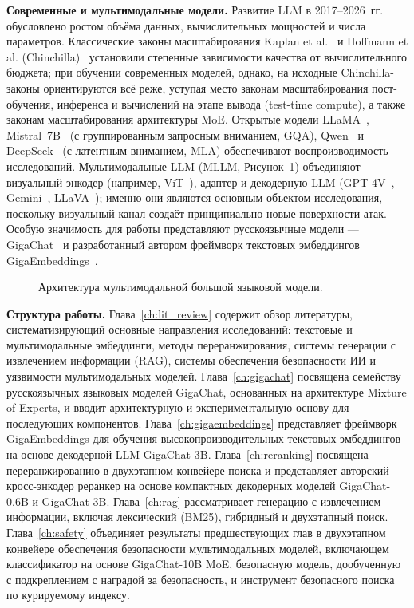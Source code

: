\textbf{Современные и мультимодальные модели.} Развитие LLM в 2017--2026~гг. обусловлено ростом объёма данных, вычислительных мощностей и числа параметров. Классические законы масштабирования Kaplan et al.~\cite{kaplan2020scaling} и Hoffmann et al. (Chinchilla)~\cite{hoffmann2022chinchilla} установили степенные зависимости качества от вычислительного бюджета; при обучении современных моделей, однако, на исходные Chinchilla-законы ориентируются всё реже, уступая место законам масштабирования пост-обучения, инференса и вычислений на этапе вывода (test-time compute), а также законам масштабирования архитектуры MoE. Открытые модели LLaMA~\cite{touvron2023llama,touvron2023llama2,grattafiori2024llama3}, Mistral~7B~\cite{jiang2023mistral} (с группированным запросным вниманием, GQA), Qwen~\cite{bai2023qwen} и DeepSeek~\cite{deepseek2024v2} (с латентным вниманием, MLA) обеспечивают воспроизводимость исследований. Мультимодальные LLM (MLLM, Рисунок~\ref{fig:multimodal_llm}) объединяют визуальный энкодер (например, ViT~\cite{dosovitskiy2020vit}), адаптер и декодерную LLM (GPT-4V~\cite{achiam2023gpt4}, Gemini~\cite{team2023gemini}, LLaVA~\cite{liu2024llava}); именно они являются основным объектом исследования, поскольку визуальный канал создаёт принципиально новые поверхности атак. Особую значимость для работы представляют русскоязычные модели --- GigaChat~\cite{2506.09440} и разработанный автором фреймворк текстовых эмбеддингов GigaEmbeddings~\cite{2510.22369}.

\begin{figure}[htbp]
    \centering
    \resizebox{0.8\textwidth}{!}{
        
    }
    \caption{Архитектура мультимодальной большой языковой модели.}
    \label{fig:multimodal_llm}
\end{figure}

\textbf{Структура работы.} Глава~\ref{ch:lit_review} содержит обзор литературы, систематизирующий основные направления исследований: текстовые и мультимодальные эмбеддинги, методы переранжирования, системы генерации с извлечением информации (RAG), системы обеспечения безопасности ИИ и уязвимости мультимодальных моделей. Глава~\ref{ch:gigachat} посвящена семейству русскоязычных языковых моделей GigaChat, основанных на архитектуре Mixture of Experts, и вводит архитектурную и экспериментальную основу для последующих компонентов. Глава~\ref{ch:gigaembeddings} представляет фреймворк GigaEmbeddings для обучения высокопроизводительных текстовых эмбеддингов на основе декодерной LLM GigaChat-3B. Глава~\ref{ch:reranking} посвящена переранжированию в двухэтапном конвейере поиска и представляет авторский кросс-энкодер реранкер на основе компактных декодерных моделей GigaChat-0.6B и GigaChat-3B. Глава~\ref{ch:rag} рассматривает генерацию с извлечением информации, включая лексический (BM25), гибридный и двухэтапный поиск. Глава~\ref{ch:safety} объединяет результаты предшествующих глав в двухэтапном конвейере обеспечения безопасности мультимодальных моделей, включающем классификатор на основе GigaChat-10B MoE, безопасную модель, дообученную с подкреплением с наградой за безопасность, и инструмент безопасного поиска по курируемому индексу.
